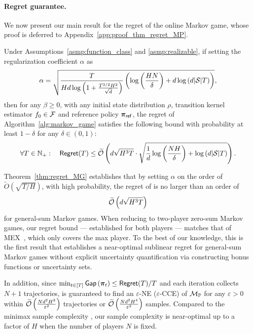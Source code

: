 \paragraph{Regret guarantee.} We now present our main result for the regret of the online Markov game, whose  proof is deferred to Appendix~\ref{app:proof_thm_regret_MP}. 
\begin{thm}\label{thm:regret_MG}
    Under Assumptions~\ref{asmp:function_class} and \ref{asmp:realizable}, if setting the regularization coefficient $\alpha$ as
    $$\alpha = \sqrt{\frac{ T}{Hd\log\left(1+\frac{T^{3/2}H^2}{\sqrt{d}}\right)} \left( \log\left(\frac{HN}{\delta}\right) + d\log\left(d|{\mathcal{S}}|T\right) \right) },$$
    then for any $\beta\geq 0$, with any initial state distribution $\rho$, transition kernel estimator $f_0\in{\mathcal{F}}$ and reference policy ${\bm{\pi}}_{\mathsf{ref}}$, the regret of Algorithm~\ref{alg:markov_game} satisfies the following bound with probability at least $1-\delta$ for any $\delta\in(0,1)$:
    \begin{align}\label{eq:regret_MG_bd}
        \forall T\in{\mathbb N}_+:\quad\mathsf{Regret}(T)\leq \widetilde{{\mathcal{O}}}\left(d \sqrt{H^3T}\cdot\sqrt{\frac{1}{d}\log\left(\frac{NH}{\delta}\right) + \log\left(d|{\mathcal{S}}|T\right) 
        }\right).
    \end{align}
\end{thm}
Theorem~\ref{thm:regret_MG} establishes that by setting $\alpha$ on the order of $\widetilde{O}(\sqrt{T/H})$, with high probability, the regret of \name is no larger than an order of
$$ \widetilde{{\mathcal{O}}}\left(d \sqrt{H^3T}\right)$$
for general-sum Markov games. When reducing to  two-player zero-sum Markov games, our  regret bound --- established for both players --- matches that of MEX~\citep{liu2024maximize}, which only covers  the max player. To the best of our knowledge, this is the first result that establishes a near-optimal sublinear regret for general-sum Markov games without explicit uncertainty quantification via constructing bonus functions or uncertainty sets. 

In addition, since
$    \min_{t\in[T]}\mathsf{Gap}\left({\bm{\pi}}_t\right)\leq  \mathsf{Regret}(T) / T$ and each iteration collects $N+1$ trajectories, \name is guaranteed to find an $ \varepsilon$-NE ($\varepsilon$-CCE) of ${\mathcal{M}}_{\mathbb P}$ for any $\varepsilon>0$ within
$\widetilde{{\mathcal{O}}}\left(\frac{ Nd^2H^3}{\varepsilon^2}\right)$ trajectories
or
$\widetilde{{\mathcal{O}}}\left(\frac{ N d^2 H^4}{\varepsilon^2}\right)$ samples. Compared to the minimax sample complexity \citep{chen2022almost}, our sample complexity is near-optimal up to a factor of $H$ when the number of players $N$ is fixed.

